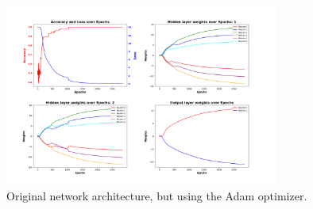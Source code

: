 \documentclass{article}
\begin{document}
    \begin{figure}
        \centering
        \includegraphics[width=0.8\textwidth]{images/plt-06}
        \caption{Original network architecture, but using the Adam optimizer.}
        \label{fig:9}
    \end{figure}

    \newpage
    \medskip
    \printbibliography
\end{document}
